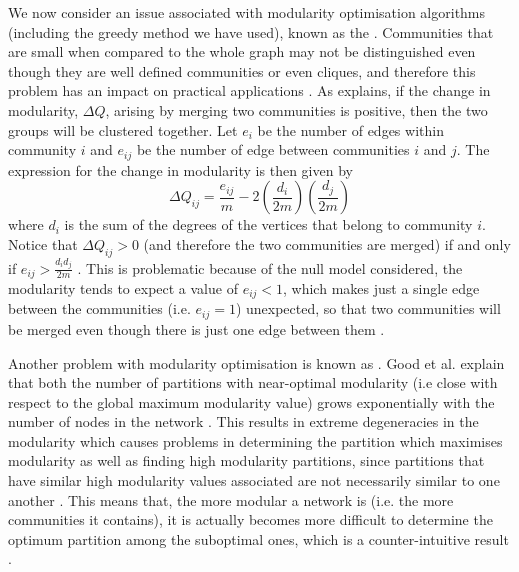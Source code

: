 We now consider an issue associated with modularity optimisation algorithms (including the greedy method we have used), known as the  \cite{GMC10,For10}.
Communities that are small when compared to the whole graph may not be distinguished even though they are well defined communities or even cliques, and therefore this problem has an impact on practical applications \cite{For10}.
As \cite{GMC10,For10} explains, if the change in modularity, $\Delta Q$, arising by merging two communities is positive, then the two groups will be clustered together.
Let $e_{i}$ be the number of edges within community $i$ and $e_{ij}$ be the number of edge between communities $i$ and $j$.
The expression for the change in modularity is then given by
\begin{equation}
	\label{eq:resolutionLimit}
	\Delta Q_{ij} = \frac{e_{ij}}{m} -2 \left( \frac{d_{i}}{2m} \right) \left( \frac{d_{j}}{2m} \right)
\end{equation}
where $d_{i}$ is the sum of the degrees of the vertices that belong to community $i$.
Notice that $\Delta Q_{ij} > 0$ (and therefore the two communities are merged) if and only if $e_{ij} > \frac{d_{i}d_{j}}{2m}$ \cite{GMC10}.
This is problematic because of the null model considered, the modularity tends to expect a value of $e_{ij} < 1$, which makes just a single edge between the communities (i.e. $e_{ij}=1$) unexpected, so that two communities will be merged even though there is just one edge between them \cite{GMC10}.

Another problem with modularity optimisation is known as  \cite{GMC10,For10}.
Good et al. \cite{GMC10} explain that both the number of partitions with near-optimal modularity (i.e close with respect to the global maximum modularity value) grows exponentially with the number of nodes in the network \cite{For10}.
This results in extreme degeneracies in the modularity which causes problems in determining the partition which maximises modularity as well as finding high modularity partitions, since partitions that have similar high modularity values associated are not necessarily similar to one another \cite{For10,GMC10}.
This means that, the more modular a network is (i.e. the more communities it contains), it is actually becomes more difficult to determine the optimum partition among the suboptimal ones, which is a counter-intuitive result \cite{GMC10}.

